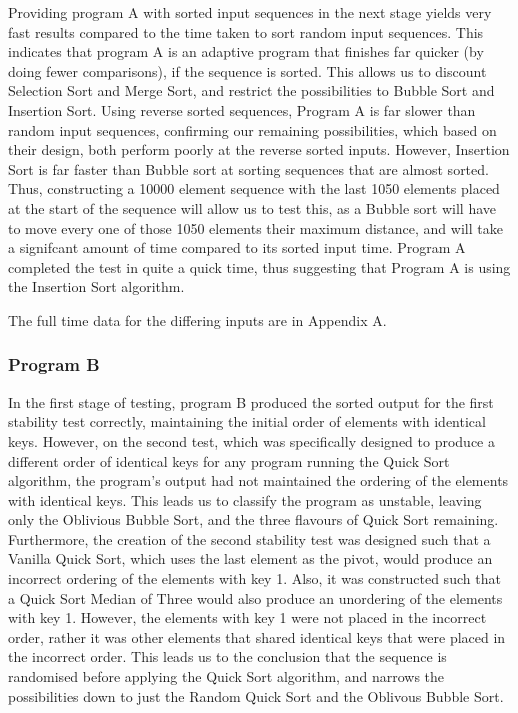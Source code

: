 \documentclass[a4paper]{article}
\begin{document}
Providing program A with sorted input sequences in the next stage yields very fast results compared to the time taken to sort random input sequences. This indicates that program A is an adaptive program that finishes far quicker (by doing fewer comparisons), if the sequence is sorted. This allows us to discount Selection Sort and Merge Sort, and restrict the possibilities to Bubble Sort and Insertion Sort. Using reverse sorted sequences, Program A is far slower than random input sequences, confirming our remaining possibilities, which based on their design, both perform poorly at the reverse sorted inputs. However, Insertion Sort is far faster than Bubble sort at sorting sequences that are almost sorted. Thus, constructing a 10000 element sequence with the last 1050 elements placed at the start of the sequence will allow us to test this, as a Bubble sort will have to move every one of those 1050 elements their maximum distance, and will take a signifcant amount of time compared to its sorted input time. Program A completed the test in quite a quick time, thus suggesting that Program A is using the Insertion Sort algorithm.

The full time data for the differing inputs are in Appendix A.

\pagebreak

\subsubsection{Program B}
In the first stage of testing, program B produced the sorted output for the first stability test correctly, maintaining the initial order of elements with identical keys. However, on the second test, which was specifically designed to produce a different order of identical keys for any program running the Quick Sort algorithm, the program's output had not maintained the ordering of the elements with identical keys. This leads us to classify the program as unstable, leaving only the Oblivious Bubble Sort, and the three flavours of Quick Sort remaining. Furthermore, the creation of the second stability test was designed such that a Vanilla Quick Sort, which uses the last element as the pivot, would produce an incorrect ordering of the elements with key 1. Also, it was constructed such that a Quick Sort Median of Three would also produce an unordering of the elements with key 1. However, the elements with key 1 were not placed in the incorrect order, rather it was other elements that shared identical keys that were placed in the incorrect order. This leads us to the conclusion that the sequence is randomised before applying the Quick Sort algorithm, and narrows the possibilities down to just the Random Quick Sort and the Oblivous Bubble Sort.
\end{document}
